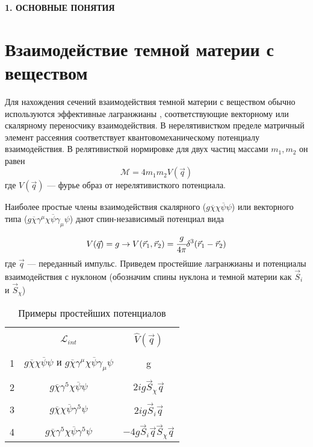 \newpage
\begin{center}
	\textbf{\large 1. ОСНОВНЫЕ ПОНЯТИЯ}
\end{center}




\section{Взаимодействие темной материи с веществом}
Для нахождения сечений взаимодействия темной материи с веществом обычно используются эффективные лагранжианы \cite{Fitzpatrick_2013}, соответствующие векторному или скалярному переносчику взаимодействия. В нерелятивистком пределе матричный элемент рассеяния соответствует квантовомеханическому потенциалу взаимодействия. В релятивисткой нормировке для двух частиц массами $m_1,m_2$ он равен 
\begin{equation}
	\label{eq:mat_element}
	\mathcal{M} = 4m_1 m_2 V(\vec{q})
\end{equation}
где $V(\vec{q})$ --- фурье образ от нерелятивисткого потенциала. 

Наиболее простые члены взаимодействия  скалярного ($g\overline{\chi}\chi\overline{\psi}\psi$) или векторного типа ($g\overline{\chi}\gamma^{\mu}\chi\overline{\psi}\gamma_{\mu}\psi$) дают спин-независимый потенциал вида
\begin{eqnarray}
	V(\vec{q}) = g \rightarrow	V(\vec{r}_1,\vec{r}_2) = \cfrac{g}{4\pi}
	\delta^3(\vec{r}_1-\vec{r}_2)
\end{eqnarray}
где $\vec{q}$ --- переданный импульс. Приведем простейшие лагранжианы и потенциалы взаимодействия с нуклоном (обозначим спины нуклона и темной материи как $\vec{S}_{i}$ и  $\vec{S}_{\chi}$)

\begin{table}[ht]
	\begin{center}
		\begin{tabular}{|c|c|c|}
			\hline && \\[-1em] 
			 & $\mathcal{L}_{int}$ & $\hat{V}(\vec{q})$ \\
			\hline && \\[-1em] 
			1 & $g\overline{\chi}\chi\overline{\psi}\psi$ и 	
			$g\overline{\chi}\gamma^{\mu}\chi\overline{\psi}\gamma_{\mu}\psi$ & g \\
			\hline && \\[-1em] 
			2 & $g \overline{\chi}\gamma^5\chi\overline{\psi}\psi$ & $2ig \vec{S}_{\chi}\vec{q}$\\
			\hline && \\[-1em]
			3 & $g \overline{\chi}\chi\overline{\psi}\gamma^5\psi$ & $2ig \vec{S}_{i}\vec{q}$\\
			\hline && \\[-1em]
			4 & $g \overline{\chi}\gamma^5\chi\overline{\psi}\gamma^5\psi$ & $-4g \vec{S}_{i}\vec{q}\vec{S}_{\chi}\vec{q}$\\
			\hline
		\end{tabular}
		\caption{Примеры простейших потенциалов}
	\end{center}		
	\label{tb:potentials}
\end{table}

